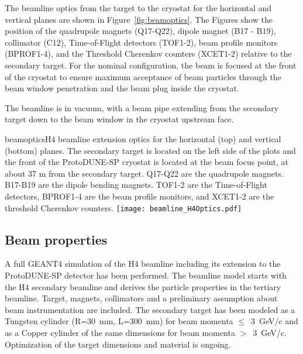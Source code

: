 The beamline optics from the target to the cryostat for the horizontal and vertical planes are shown in Figure~\ref{fig:beamoptics}. The Figures show the position of the quadrupole magnets (Q17-Q22), dipole magnet (B17 - B19), collimator (C12), Time-of-Flight detectors (TOF1-2), beam profile monitors (BPROF1-4), and the Threshold Cherenkov counters (XCET1-2)  relative to the secondary target.  For the nominal configuration, the beam is focused at the front of the cryostat to ensure maximum acceptance of beam particles through the beam window penetration and the beam plug inside the cryostat.

The beamline is in vacuum, with a beam pipe extending from the secondary target down to the beam window in the cryostat upstream face. 

\begin{cdrfigure}{beamoptics}{H4 beamline extension optics for the horizontal (top) and vertical (bottom) planes. The secondary target is located on the left side of the plots and the front of the ProtoDUNE-SP cryostat is located at the beam focus point, at about 37 m from the secondary target. Q17-Q22 are the quadrupole magnets. B17-B19 are the dipole bending magnets. TOF1-2 are the Time-of-Flight detectors, BPROF1-4 are the beam profile monitors, and XCET1-2 are the threshold Cherenkov counters. }
 \texttt{[image: beamline\_H4Optics.pdf]}
\end{cdrfigure}

\subsection{Beam properties}
A full GEANT4 simulation of the H4 beamline including its extension to the ProtoDUNE-SP detector %
has been performed.%
 The beamline model starts with the H4 secondary beamline 
and derives the particle properties in the tertiary beamline.  Target, magnets, collimators and a preliminary assumption
about beam instrumentation are included. The secondary target has been
modeled as a Tungsten cylinder (R=30~mm, L=300~mm) for beam momenta $\leq$~3~GeV/c and as a Copper cylinder of the same dimensions  for beam momenta  $>$~3~GeV/c. Optimization of the target dimensions and material is ongoing.

